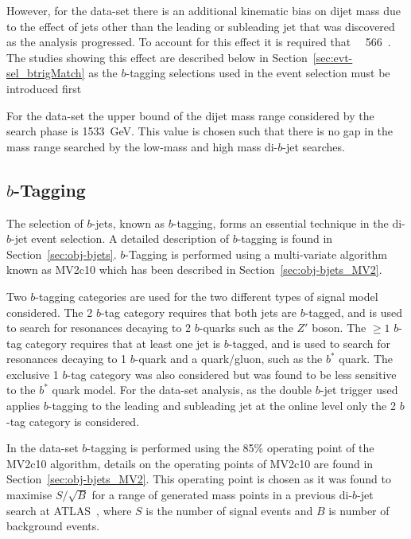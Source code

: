 However, for the \lm{} data-set
there is an additional kinematic bias on dijet mass 
due to the effect of jets other than the leading or subleading jet
that was discovered as the analysis progressed.
To account for this effect it is required that \mjj{}~\gt{}~566~\GeV{}.
The studies showing this effect are described below in Section~\ref{sec:evt-sel_btrigMatch}
as the $b$-tagging selections used in the \lm{} event selection must be introduced first

For the \lm{} data-set the upper bound of the dijet mass range considered by the search phase is 1533~GeV.
This value is chosen such that there is no gap in the mass range searched by the low-mass and high mass di-$b$-jet searches.

\subsection{$b$-Tagging}
\label{sec:evt-sel-btag}

The selection of $b$-jets, known as $b$-tagging,
forms an essential technique in the di-$b$-jet event selection.
A detailed description of $b$-tagging is found in Section~\ref{sec:obj-bjets}.
$b$-Tagging is performed using a multi-variate algorithm known as MV2c10 which has been described in Section~\ref{sec:obj-bjets_MV2}.

Two $b$-tagging categories are used for the two different types of signal model considered.
The 2 $b$-tag category requires that both jets are $b$-tagged,
and is used to search for resonances decaying to 2 $b$-quarks such as the $Z'$ boson.
The $\geq 1$ $b$-tag category requires that at least one jet is $b$-tagged,
and is used to search for resonances decaying to 1 $b$-quark and a quark/gluon, such as the $b^*$ quark.
The exclusive 1 $b$-tag category was also considered but was found to be less sensitive to the $b^*$ quark model.
For the \lm{} data-set analysis,
as the double $b$-jet trigger used applies $b$-tagging to the leading and subleading jet at the online level
only the 2 $b$-tag category is considered.

In the \summer{} data-set
$b$-tagging is performed using the 85\% operating point of the MV2c10 algorithm,
details on the operating points of MV2c10 are found in Section~\ref{sec:obj-bjets_MV2}.
This operating point is chosen as it was found to maximise $S/\sqrt{B}$ for a range of generated mass points
in a previous di-$b$-jet search at ATLAS~\cite{dibjet-mori16_paper},
where $S$ is the number of signal events and $B$ is number of background events.

